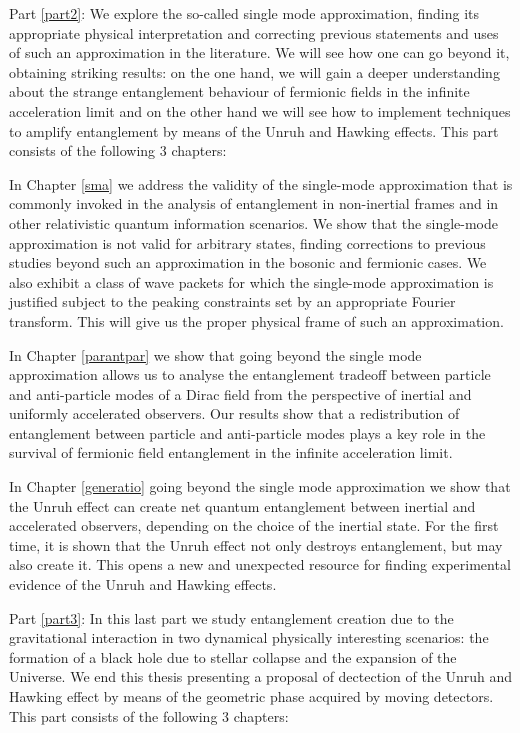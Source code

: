 \begin{list}{}{\leftmargin=1em}
\begin{list}{}{\leftmargin=1em}
\end{list}
\item Part \ref{part2}: We explore the so-called single mode approximation, finding its appropriate physical interpretation and correcting previous statements and uses of such an approximation in the literature. We will see how one can go beyond it, obtaining striking results: on the one hand, we will gain a  deeper understanding about the strange entanglement behaviour of fermionic fields in the infinite acceleration limit and on the other hand we will see how to implement techniques to amplify entanglement by means of the Unruh and Hawking effects. This part consists of the following 3 chapters:
\begin{list}{}{\leftmargin=1em}
\item In Chapter \ref{sma} we address the validity of the single-mode approximation that is commonly invoked in the analysis of entanglement in non-inertial frames and in other relativistic quantum information scenarios. We show that the single-mode approximation is not valid for arbitrary states, finding corrections to previous studies beyond such an approximation in the bosonic and fermionic cases. We also exhibit a class of wave packets for which the single-mode approximation is justified subject to the peaking constraints set by an appropriate Fourier transform. This will give us the proper physical frame of such an approximation.
\item In Chapter \ref{parantpar} we show that going beyond the single mode approximation allows us to analyse the entanglement tradeoff between particle and anti-particle modes of a Dirac field from the perspective of inertial and uniformly accelerated observers. Our results show that a redistribution of entanglement between particle and anti-particle modes plays a key role in the survival of fermionic field entanglement in the infinite acceleration limit.
\item In Chapter \ref{generatio}  going beyond the single mode approximation we show that the Unruh effect can create net quantum entanglement between inertial and accelerated observers, depending on the choice of the inertial state. For the first time, it is shown that the Unruh effect not only destroys entanglement, but may also create it. This opens a new and unexpected resource for finding experimental evidence of the Unruh and Hawking effects.
\end{list}
\item  Part \ref{part3}:   In this last part we study entanglement creation due to the gravitational interaction in two dynamical physically interesting scenarios: the formation of a black hole due to stellar collapse and the expansion of the Universe. We end this thesis presenting a proposal of dectection of the Unruh and Hawking effect by means of the geometric phase acquired by moving detectors. This part consists of the following 3 chapters:

\end{list}
